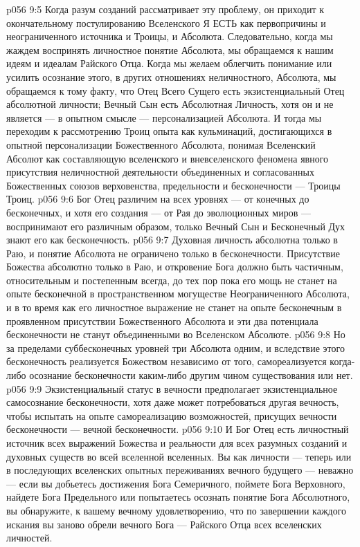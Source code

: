 \vs p056 9:5 Когда разум созданий рассматривает эту проблему, он приходит к окончательному постулированию Вселенского Я ЕСТЬ как первопричины и неограниченного источника и Троицы, и Абсолюта. Следовательно, когда мы жаждем воспринять личностное понятие Абсолюта, мы обращаемся к нашим идеям и идеалам Райского Отца. Когда мы желаем облегчить понимание или усилить осознание этого, в других отношениях неличностного, Абсолюта, мы обращаемся к тому факту, что Отец Всего Сущего есть экзистенциальный Отец абсолютной личности; Вечный Сын есть Абсолютная Личность, хотя он и не является --- в опытном смысле --- персонализацией Абсолюта. И тогда мы переходим к рассмотрению Троиц опыта как кульминаций, достигающихся в опытной персонализации Божественного Абсолюта, понимая Вселенский Абсолют как составляющую вселенского и вневселенского феномена явного присутствия неличностной деятельности объединенных и согласованных Божественных союзов верховенства, предельности и бесконечности --- Троицы Троиц.
\vs p056 9:6 \pc Бог Отец различим на всех уровнях --- от конечных до бесконечных, и хотя его создания --- от Рая до эволюционных миров --- воспринимают его различным образом, только Вечный Сын и Бесконечный Дух знают его как бесконечность.
\vs p056 9:7 Духовная личность абсолютна только в Раю, и понятие Абсолюта не ограничено только в бесконечности. Присутствие Божества абсолютно только в Раю, и откровение Бога должно быть частичным, относительным и постепенным всегда, до тех пор пока его мощь не станет на опыте бесконечной в пространственном могуществе Неограниченного Абсолюта, и в то время как его личностное выражение не станет на опыте бесконечным в проявленном присутствии Божественного Абсолюта и эти два потенциала бесконечности не станут объединенными во Вселенском Абсолюте.
\vs p056 9:8 Но за пределами суббесконечных уровней три Абсолюта  одним, и вследствие этого бесконечность реализуется Божеством независимо от того, самореализуется когда\hyp{}либо осознание бесконечности каким\hyp{}либо другим чином существования или нет.
\vs p056 9:9 Экзистенциальный статус в вечности предполагает экзистенциальное самосознание бесконечности, хотя даже может потребоваться другая вечность, чтобы испытать на опыте самореализацию возможностей, присущих вечности бесконечности --- вечной бесконечности.
\vs p056 9:10 \pc И Бог Отец есть личностный источник всех выражений Божества и реальности для всех разумных созданий и духовных существ во всей вселенной вселенных. Вы как личности --- теперь или в последующих вселенских опытных переживаниях вечного будущего --- неважно --- если вы добьетесь достижения Бога Семеричного, поймете Бога Верховного, найдете Бога Предельного или попытаетесь осознать понятие Бога Абсолютного, вы обнаружите, к вашему вечному удовлетворению, что по завершении каждого искания вы заново обрели вечного Бога --- Райского Отца всех вселенских личностей.

